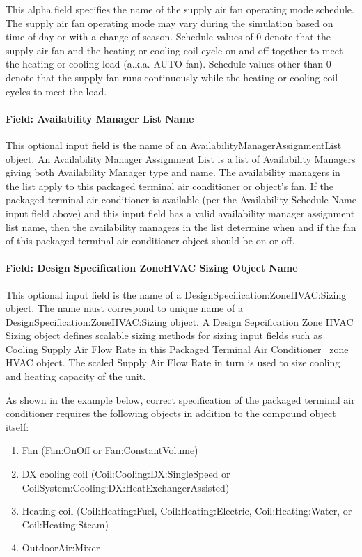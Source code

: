 This alpha field specifies the name of the supply air fan operating mode schedule. The supply air fan operating mode may vary during the simulation based on time-of-day or with a change of season. Schedule values of 0 denote that the supply air fan and the heating or cooling coil cycle on and off together to meet the heating or cooling load (a.k.a. AUTO fan). Schedule values other than 0 denote that the supply fan runs continuously while the heating or cooling coil cycles to meet the load.

\paragraph{Field: Availability Manager List Name}\label{field-availability-manager-list-name-6}

This optional input field is the name of an AvailabilityManagerAssignmentList object. An Availability Manager Assignment List is a list of Availability Managers giving both Availability Manager type and name. The availability managers in the list apply to this packaged terminal air conditioner or object's fan. If the packaged terminal air conditioner is available (per the Availability Schedule Name input field above) and this input field has a valid availability manager assignment list name, then the availability managers in the list determine when and if the fan of this packaged terminal air conditioner object should be on or off.

\paragraph{Field: Design Specification ZoneHVAC Sizing Object Name}\label{field-design-specification-zonehvac-sizing-object-name-6}

This optional input field is the name of a DesignSpecification:ZoneHVAC:Sizing object. The name must correspond to unique name of a DesignSpecification:ZoneHVAC:Sizing object. A Design Sepcification Zone HVAC Sizing object defines scalable sizing methods for sizing input fields such as Cooling Supply Air Flow Rate in this Packaged Terminal Air Conditioner~ zone HVAC object. The scaled Supply Air Flow Rate in turn is used to size cooling and heating capacity of the unit.

As shown in the example below, correct specification of the packaged terminal air conditioner requires the following objects in addition to the compound object itself:

\begin{enumerate}
\def\labelenumi{\arabic{enumi})}
\item
  Fan (Fan:OnOff or Fan:ConstantVolume)
\item
  DX cooling coil (Coil:Cooling:DX:SingleSpeed or CoilSystem:Cooling:DX:HeatExchangerAssisted)
\item
  Heating coil (Coil:Heating:Fuel, Coil:Heating:Electric, Coil:Heating:Water, or Coil:Heating:Steam)
\item
  OutdoorAir:Mixer
\end{enumerate}

